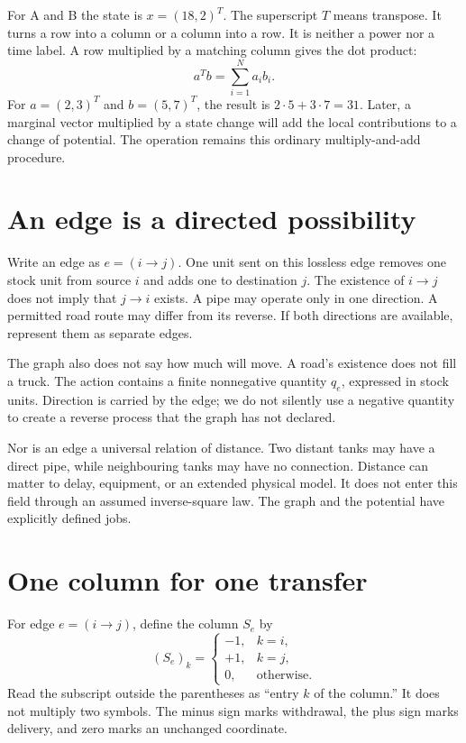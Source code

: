 For A and B the state is \(x=(18,2)^T\). The superscript \(T\) means transpose. It turns a row into a column or a column into a row. It is neither a power nor a time label. A row multiplied by a matching column gives the dot product:
\begin{equation}
 a^Tb=\sum_{i=1}^{N}a_i b_i.
\end{equation}
For \(a=(2,3)^T\) and \(b=(5,7)^T\), the result is \(2\cdot5+3\cdot7=31\). Later, a marginal vector multiplied by a state change will add the local contributions to a change of potential. The operation remains this ordinary multiply-and-add procedure.

\section{An edge is a directed possibility}
Write an edge as \(e=(i\to j)\). One unit sent on this lossless edge removes one stock unit from source \(i\) and adds one to destination \(j\). The existence of \(i\to j\) does not imply that \(j\to i\) exists. A pipe may operate only in one direction. A permitted road route may differ from its reverse. If both directions are available, represent them as separate edges.

The graph also does not say how much will move. A road's existence does not fill a truck. The action contains a finite nonnegative quantity \(q_e\), expressed in stock units. Direction is carried by the edge; we do not silently use a negative quantity to create a reverse process that the graph has not declared.

Nor is an edge a universal relation of distance. Two distant tanks may have a direct pipe, while neighbouring tanks may have no connection. Distance can matter to delay, equipment, or an extended physical model. It does not enter this field through an assumed inverse-square law. The graph and the potential have explicitly defined jobs.

\section{One column for one transfer}
For edge \(e=(i\to j)\), define the column \(S_e\) by
\begin{equation}
 (S_e)_k=\begin{cases}-1,&k=i,\\+1,&k=j,\\0,&\text{otherwise}.\end{cases}
\end{equation}
Read the subscript outside the parentheses as ``entry \(k\) of the column.'' It does not multiply two symbols. The minus sign marks withdrawal, the plus sign marks delivery, and zero marks an unchanged coordinate.

